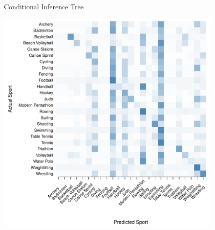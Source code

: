 \begin{figure}
\begin{center}
\begin{minipage}{0.20\textwidth}
  \end{minipage}


    Conditional Inference Tree \\

  \begin{minipage}{0.20\textwidth}
    \begin{center}
      \includegraphics[scale=0.20]{../graphics/sportCIT-trn.pdf}
    \end{center}
  \end{minipage}
  \hspace{0.05\textwidth}
  \begin{minipage}{0.20\textwidth}
    \begin{center}

\end{center}
\end{minipage}
\end{center}
\end{figure}
